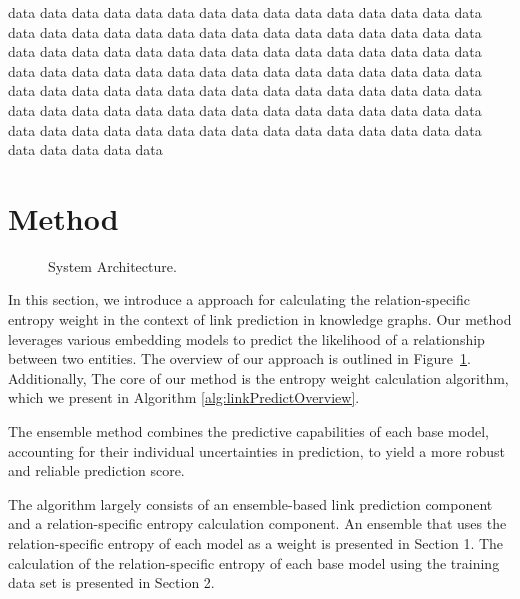 \documentclass{article}
\begin{document}
data data data data data data data data data data data data data data data data data data data data data data data data data data data data data data data data data data data data data data data data data data data data data data data data data data data data data data data data data data data data data data data data data data data data data data data data data data data data data data data data data data data data data data data data data data data data data data data data data data data data data data data data data data data data data data 
\section{Method}

\bgroup
\begin{figure}[t]
  \centering \makeatletter{}
  \makeatother
  \caption{{System Architecture.}}
  \label{fig:sysArch}
  \hfill
\end{figure}
\egroup


In this section, we introduce a approach for calculating the relation-specific entropy weight in the context of link prediction in knowledge graphs. Our method leverages various embedding models to predict the likelihood of a relationship between two entities. The overview of our approach is outlined in Figure~\ref{fig:sysArch}. Additionally, The core of our method is the entropy weight calculation algorithm, which we present in Algorithm \ref{alg:linkPredictOverview}. 


The ensemble method combines the predictive capabilities of each base model, accounting for their individual uncertainties in prediction, to yield a more robust and reliable prediction score. 






The algorithm largely consists of an ensemble-based link prediction component and a relation-specific entropy calculation component. An ensemble that uses the relation-specific entropy of each model as a weight is presented in Section 1. The calculation of the relation-specific entropy of each base model using the training data set is presented in Section 2. 
\end{document}
